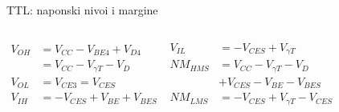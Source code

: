 \begin{frame}[label=10-s059]{TTL: naponski nivoi i margine}
\setlength{\abovedisplayskip}{4pt}\setlength{\belowdisplayskip}{4pt}\setlength{\abovedisplayshortskip}{3pt}\setlength{\belowdisplayshortskip}{3pt}
\begin{columns}[T,onlytextwidth]
\(\displaystyle\begin{aligned}V_{OH}&=V_{CC}-V_{BE4}+V_{D4}\\&=V_{CC}-V_{\gamma T}-V_D\\V_{OL}&=V_{CE3}=V_{CES}\\V_{IH}&=-V_{CES}+V_{BE}+V_{BES}\end{aligned}\)
\(\displaystyle\begin{aligned}V_{IL}&=-V_{CES}+V_{\gamma T}\\NM_{HMS}&=V_{CC}-V_{\gamma T}-V_D\\&+V_{CES}-V_{BE}-V_{BES}\\NM_{LMS}&=-V_{CES}+V_{\gamma T}-V_{CES}\end{aligned}\)
\end{columns}
\end{frame}
